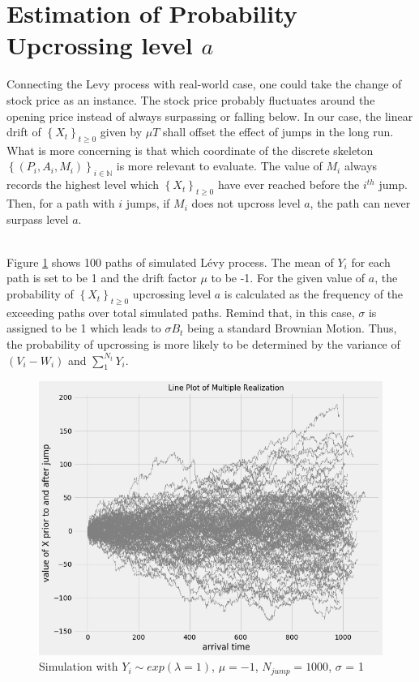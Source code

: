 \section{Estimation of Probability Upcrossing level $a$}
Connecting the Levy process with real-world case, one could take the change of stock price as an instance. The stock price probably fluctuates around the opening price instead of always surpassing or falling below. In our case, the linear drift of $\left\{X_{t}\right\}_{t \geq 0}$ given by $\mu T$ shall offset the effect of jumps in the long run. What is more concerning is that which coordinate of the discrete skeleton $\left\{\left(P_{i}, A_{i}, M_{i}\right)\right\}_{i \in \mathbb{N}}$ is more relevant to evaluate. The value of $M_i$ always records the highest level which $\left\{X_{t}\right\}_{t \geq 0}$ have ever reached before the $i^{th}$ jump. Then, for a path with $i$ jumps, if $M_i$ does not upcross level $a$, the path can never surpass level $a$.

\\
Figure \ref{fig:task5-3} shows 100 paths of simulated Lévy process. The mean of $Y_i$ for each path is set to be 1 and the drift factor $\mu$ to be -1. For the given value of $a$, the probability of $\left\{X_{t}\right\}_{t \geq 0}$ upcrossing level $a$ is calculated as the frequency of the exceeding paths over total simulated paths. Remind that, in this case, $\sigma$ is assigned to be 1 which leads to $\sigma B_t$ being a standard Brownian Motion. Thus, the probability of upcrossing is more likely to be determined by the variance of $(V_i-W_i)$ and $\sum_1^{N_t}Y_i$.
\begin{figure}[H]
    \centering
    \includegraphics[scale = 0.45]{figures/task5-3.png}
    \caption{Simulation with $Y_i \sim {exp(\lambda = 1)}$, $\mu = -1$, $N_{jump} = 1000$, $\sigma$ = 1}
    \label{fig:task5-3}
\end{figure}

